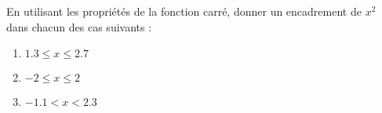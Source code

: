 
\begin{exercice}\label{exosmath-0139}

    En utilisant les propriétés de la fonction carré, donner un encadrement de \( x^2\) dans chacun des cas suivants :
    \begin{enumerate}
        \item
            \( 1.3\leq x\leq 2.7\)
        \item
            \( -2\leq x\leq 2\)
        \item
            \( -1.1< x<2.3\)
    \end{enumerate}

\end{exercice}
